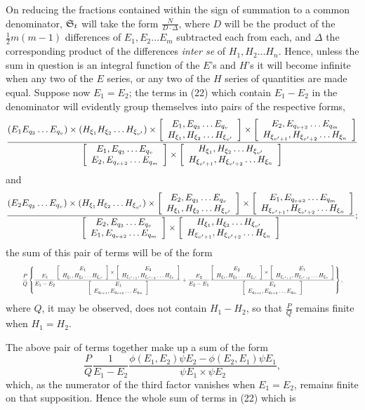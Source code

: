 \documentclass[11pt]{article}
\newcommand{\sourcepage}[1]{\marginpar{\scriptsize p.~#1}}
\begin{document}
\sourcepage{462}
On reducing the fractions contained within the sign of summation to a common denominator, $\mathfrak{S}_t$ will take the form $\frac{N}{D\cdot\Delta}$, where $D$ will be the product of the $\frac12m(m-1)$ differences of $E_1,E_2\ldots E_m$ subtracted each from each, and $\Delta$ the corresponding product of the differences \emph{inter se} of $H_1,H_2\ldots H_n$. Hence, unless the sum in question is an integral function of the $E$'s and $H$'s it will become infinite when any two of the $E$ series, or any two of the $H$ series of quantities are made equal. Suppose now $E_1=E_2$; the terms in (22) which contain $E_1-E_2$ in the denominator will evidently group themselves into pairs of the respective forms,
\begingroup\scriptsize
\[
\frac{(E_1E_{q_3}\ldots E_{q_v})\times(H_{\xi_1}H_{\xi_2}\ldots H_{\xi_{v'}})\times
\left[\begin{array}{c}E_1,E_{q_3}\ldots E_{q_v}\\H_{\xi_1},H_{\xi_2}\ldots H_{\xi_{v'}}\end{array}\right]\times
\left[\begin{array}{c}E_2,E_{q_{v+2}}\ldots E_{q_m}\\H_{\xi_{v'+1}},H_{\xi_{v'+2}}\ldots H_{\xi_n}\end{array}\right]}{
\left[\begin{array}{c}E_1,E_{q_3}\ldots E_{q_v}\\E_2,E_{q_{v+2}}\ldots E_{q_m}\end{array}\right]\times
\left[\begin{array}{c}H_{\xi_1},H_{\xi_2}\ldots H_{\xi_{v'}}\\H_{\xi_{v'+1}},H_{\xi_{v'+2}}\ldots H_{\xi_n}\end{array}\right]}
\]
and
\[
\frac{(E_2E_{q_3}\ldots E_{q_v})\times(H_{\xi_1}H_{\xi_2}\ldots H_{\xi_{v'}})\times
\left[\begin{array}{c}E_2,E_{q_3}\ldots E_{q_v}\\H_{\xi_1},H_{\xi_2}\ldots H_{\xi_{v'}}\end{array}\right]\times
\left[\begin{array}{c}E_1,E_{q_{v+2}}\ldots E_{q_m}\\H_{\xi_{v'+1}},H_{\xi_{v'+2}}\ldots H_{\xi_n}\end{array}\right]}{
\left[\begin{array}{c}E_2,E_{q_3}\ldots E_{q_v}\\E_1,E_{q_{v+2}}\ldots E_{q_m}\end{array}\right]\times
\left[\begin{array}{c}H_{\xi_1},H_{\xi_2}\ldots H_{\xi_{v'}}\\H_{\xi_{v'+1}},H_{\xi_{v'+2}}\ldots H_{\xi_n}\end{array}\right]};
\]
\endgroup
the sum of this pair of terms will be of the form
\[
\resizebox{0.95\textwidth}{!}{$\displaystyle
\frac{P}{Q}\left\{
\frac{E_1}{E_1-E_2}
\frac{\sbrk{E_1}{H_{\xi_1},H_{\xi_2}\ldots H_{\xi_{v'}}}\times
\sbrk{E_2}{H_{\xi_{v'+1}},H_{\xi_{v'+2}}\ldots H_{\xi_n}}}{
\sbrk{E_1}{E_{q_{v+1}},E_{q_{v+2}}\ldots E_{q_m}}}
+
\frac{E_2}{E_2-E_1}
\frac{\sbrk{E_2}{H_{\xi_1},H_{\xi_2}\ldots H_{\xi_{v'}}}\times
\sbrk{E_1}{H_{\xi_{v'+1}},H_{\xi_{v'+2}}\ldots H_{\xi_n}}}{
\sbrk{E_2}{E_{q_{v+1}},E_{q_{v+2}}\ldots E_{q_m}}}
\right\},$}
\]
where $Q$, it may be observed, does not contain $H_1-H_2$, so that $\frac{P}{Q}$ remains finite when $H_1=H_2$.

The above pair of terms together make up a sum of the form
\[
\frac{P}{Q}\frac{1}{E_1-E_2}\frac{\phi(E_1,E_2)\psi E_2-\phi(E_2,E_1)\psi E_1}{\psi E_1\times\psi E_2},
\]
which, as the numerator of the third factor vanishes when $E_1=E_2$, remains finite on that supposition. Hence the whole sum of terms in (22) which is
\end{document}
